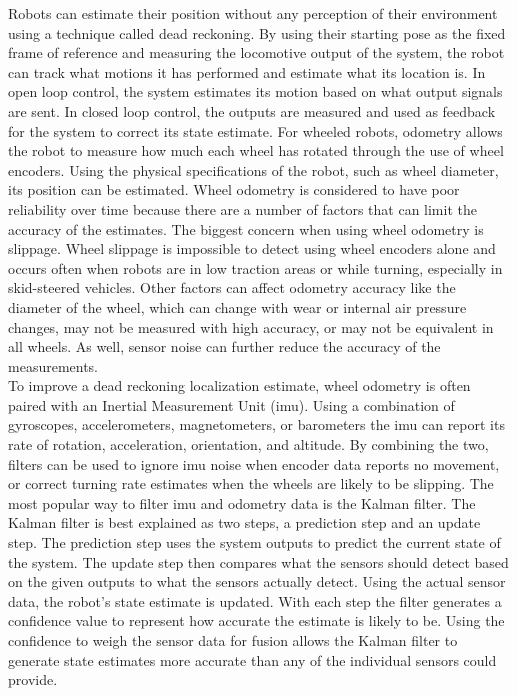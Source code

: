 Robots can estimate their position without any perception of their environment using a technique called dead reckoning. By using their starting pose as the fixed frame of reference and measuring the locomotive output of the system, the robot can track what motions it has performed and estimate what its location is. In open loop control, the system estimates its motion based on what output signals are sent. In closed loop control, the outputs are measured and used as feedback for the system to correct its state estimate. For wheeled robots, odometry allows the robot to measure how much each wheel has rotated through the use of wheel encoders. Using the physical specifications of the robot, such as wheel diameter, its position can be estimated. Wheel odometry is considered to have poor reliability over time because there are a number of factors that can limit the accuracy of the estimates. The biggest concern when using wheel odometry is slippage. Wheel slippage is impossible to detect using wheel encoders alone and occurs often when robots are in low traction areas or while turning, especially in skid-steered vehicles. Other factors can affect odometry accuracy like the diameter of the wheel, which can change with wear or internal air pressure changes, may not be measured with high accuracy, or may not be equivalent in all wheels. As well, sensor noise can further reduce the accuracy of the measurements.\\

To improve a dead reckoning localization estimate, wheel odometry is often paired with an Inertial Measurement Unit (\acrshort{imu}). Using a combination of gyroscopes, accelerometers, magnetometers, or barometers the \acrshort{imu} can report its rate of rotation, acceleration, orientation, and altitude. By combining the two, filters can be used to ignore \acrshort{imu} noise when encoder data reports no movement, or correct turning rate estimates when the wheels are likely to be slipping. The most popular way to filter \acrshort{imu} and odometry data is the Kalman filter. The Kalman filter is best explained as two steps, a prediction step and an update step. The prediction step uses the system outputs to predict the current state of the system. The update step then compares what the sensors should detect based on the given outputs to what the sensors actually detect. Using the actual sensor data, the robot's state estimate is updated. With each step the filter generates a confidence value to represent how accurate the estimate is likely to be. Using the confidence to weigh the sensor data for fusion allows the Kalman filter to generate state estimates more accurate than any of the individual sensors could provide.\\

